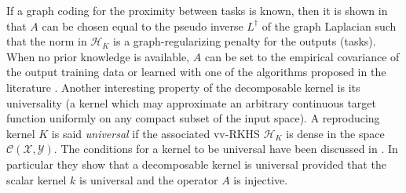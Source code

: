 If a graph coding for the proximity between tasks is known, then it is shown in \citet{Evgeniou2005,Baldassare2010,Alvarez2012} that $A$ can be chosen equal to the pseudo inverse $L^{\dagger}$ of the graph Laplacian such that the norm in $\mathcal{H}_K$ is a graph-regularizing penalty for the outputs (tasks).  When no prior knowledge is available, $A$ can be set to the empirical covariance of the output training data or learned with one of the algorithms proposed in the literature \citep{Dinuzzo2011, Sindhwani2013, Lim2015}. Another interesting property of the decomposable kernel is its universality (a kernel which may approximate an arbitrary continuous target function uniformly on any compact subset of the input space). A reproducing kernel $K$ is said \emph{universal} if the associated \acs{vv-RKHS} $\mathcal{H}_K$ is dense in the space $\mathcal{C}(\mathcal{X},\mathcal{Y})$. The conditions for a kernel to be universal have been discussed in \citet{caponnetto2008,Carmeli2010}. In particular they show that a decomposable kernel is universal provided that the scalar kernel $k$ is universal and the operator $A$ is injective.
